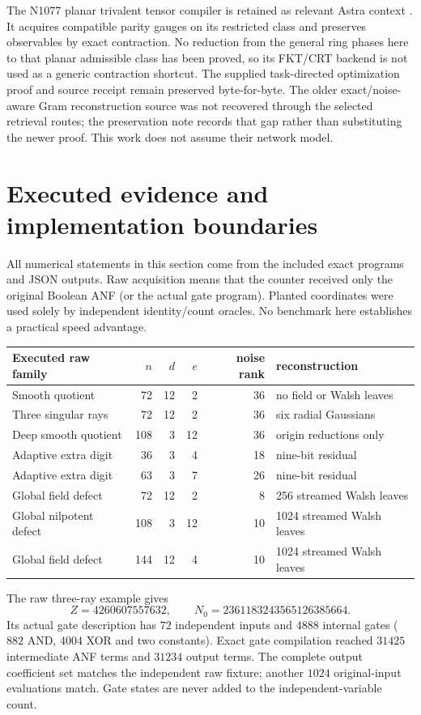 \documentclass[11pt]{article}
\theoremstyle{remark}\newtheorem{remark}[theorem]{Remark}
\begin{document}
The N1077 planar trivalent tensor compiler is retained as relevant Astra
context \cite{n1077}. It acquires compatible parity gauges on its restricted
class and preserves observables by exact contraction. No reduction from
the general ring phases here to that planar admissible class has been
proved, so its FKT/CRT backend is not used as a generic contraction shortcut.
The supplied task-directed optimization proof and source receipt remain
preserved byte-for-byte. The older exact/noise-aware Gram reconstruction
source was not recovered through the selected retrieval routes; the
preservation note records that gap rather than substituting the newer
proof. This work does not assume their network model.

\section{Executed evidence and implementation boundaries}
All numerical statements in this section come from the included exact
programs and JSON outputs. Raw acquisition means that the counter received
only the original Boolean ANF (or the actual gate program). Planted
coordinates were used solely by independent identity/count oracles.
No benchmark here establishes a practical speed advantage.

\begin{center}
\small
\begin{tabular}{lrrrrl}
\toprule
Executed raw family & $n$ & $d$ & $e$ & noise rank & reconstruction\\
\midrule
Smooth quotient &72&12&2&36& no field or Walsh leaves\\
Three singular rays &72&12&2&36& six radial Gaussians\\
Deep smooth quotient &108&3&12&36& origin reductions only\\
Adaptive extra digit &36&3&4&18& nine-bit residual\\
Adaptive extra digit &63&3&7&26& nine-bit residual\\
Global field defect &72&12&2&8& 256 streamed Walsh leaves\\
Global nilpotent defect &108&3&12&10& 1024 streamed Walsh leaves\\
Global field defect &144&12&4&10& 1024 streamed Walsh leaves\\
\bottomrule
\end{tabular}
\end{center}

The raw three-ray example gives
\[
 Z=4260607557632,\qquad
 N_0=2361183243565126385664.
\]
Its actual gate description has $72$ independent inputs and $4888$
internal gates ($882$ AND, $4004$ XOR and two constants). Exact gate
compilation reached $31425$ intermediate ANF terms and $31234$ output
terms. The complete output coefficient set matches the independent raw
fixture; another $1024$ original-input evaluations match. Gate states
are never added to the independent-variable count.
\end{document}
